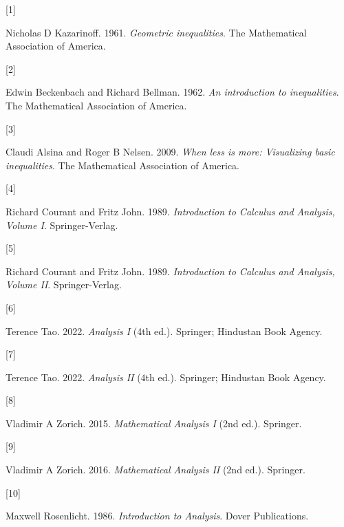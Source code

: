 \documentclass[
  a4paper,
]{article}
\newlength{\cslhangindent}
\newlength{\csllabelwidth}
\newenvironment{CSLReferences}[2] %
 {\begin{list}{}{%
  \setlength{\itemindent}{0pt}
  \setlength{\leftmargin}{0pt}
  \setlength{\parsep}{0pt}
  \ifodd #1
   \setlength{\leftmargin}{\cslhangindent}
   \setlength{\itemindent}{-1\cslhangindent}
  \fi
  \setlength{\itemsep}{#2\baselineskip}}}
 {\end{list}}
\newcommand{\CSLLeftMargin}[1]{\parbox[t]{\csllabelwidth}{\strut#1\strut}}
\newcommand{\CSLRightInline}[1]{\parbox[t]{\linewidth - \csllabelwidth}{\strut#1\strut}}
\begin{document}
\label{refs}
\begin{CSLReferences}{0}{0}
\CSLLeftMargin{{[}1{]} }%
\CSLRightInline{Nicholas D Kazarinoff. 1961. \emph{Geometric
inequalities}. The Mathematical Association of America.}

\CSLLeftMargin{{[}2{]} }%
\CSLRightInline{Edwin Beckenbach and Richard Bellman. 1962. \emph{An
introduction to inequalities}. The Mathematical Association of America.}

\CSLLeftMargin{{[}3{]} }%
\CSLRightInline{Claudi Alsina and Roger B Nelsen. 2009. \emph{When less
is more: Visualizing basic inequalities}. The Mathematical Association
of America.}

\CSLLeftMargin{{[}4{]} }%
\CSLRightInline{Richard Courant and Fritz John. 1989.
\emph{{Introduction to Calculus and Analysis, Volume I}}.
Springer-Verlag.}

\CSLLeftMargin{{[}5{]} }%
\CSLRightInline{Richard Courant and Fritz John. 1989.
\emph{{Introduction to Calculus and Analysis, Volume II}}.
Springer-Verlag.}

\CSLLeftMargin{{[}6{]} }%
\CSLRightInline{Terence Tao. 2022. \emph{{Analysis I}} (4th ed.).
Springer; Hindustan Book Agency.}

\CSLLeftMargin{{[}7{]} }%
\CSLRightInline{Terence Tao. 2022. \emph{{Analysis II}} (4th ed.).
Springer; Hindustan Book Agency.}

\CSLLeftMargin{{[}8{]} }%
\CSLRightInline{Vladimir A Zorich. 2015. \emph{{Mathematical Analysis
I}} (2nd ed.). Springer.}

\CSLLeftMargin{{[}9{]} }%
\CSLRightInline{Vladimir A Zorich. 2016. \emph{{Mathematical Analysis
II}} (2nd ed.). Springer.}

\CSLLeftMargin{{[}10{]} }%
\CSLRightInline{Maxwell Rosenlicht. 1986. \emph{{Introduction to
Analysis}}. Dover Publications.}

\end{CSLReferences}
\end{document}

